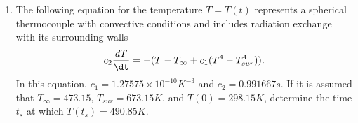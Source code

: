 \documentclass{hw}
\begin{document}
\begin{enumerate}
\item The following equation for the temperature $T=T(t)$ represents a spherical thermocouple with
convective conditions and includes radiation exchange with its surrounding walls
\[
c_{2}{dT\over\dt}=-(T-T_{\infty}+c_{1}(T^{4}-T^{4}_{sur})).
\]
In this equation, $c_{1}=1.27575\times10^{-10}K^{-3}$ and $c_{2}=0.991667s$. If it is assumed that
$T_{\infty}=473.15$, $T_{sur}=673.15K$, and $T(0)=298.15K$, determine the time $t_{s}$ at which
$T(t_{s})=490.85K$.
\end{enumerate}
\end{document}

